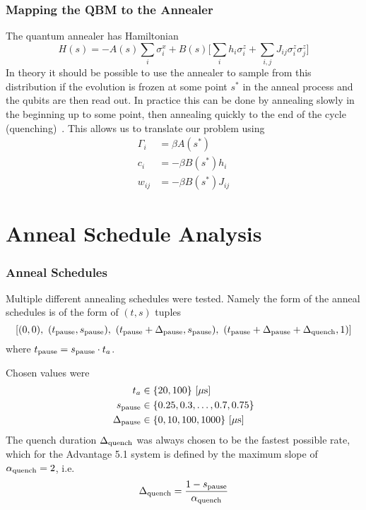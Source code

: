 \documentclass{beamer}
\begin{document}
\begin{frame}
    \frametitle{Mapping the QBM to the Annealer}
    The quantum annealer has Hamiltonian
    \[
        H(s) = -A(s) \sum_i \sigma_i^x + B(s) \bigg[ \sum_i h_i \sigma_i^z + \sum_{i,j} J_{ij} \sigma_i^z \sigma_j^z \bigg]
    \]
    In theory it should be possible to use the annealer to sample from this distribution if the evolution is frozen at some point \( s^* \) in the anneal process and the qubits are then read out. In practice this can be done by annealing slowly in the beginning up to some point, then annealing quickly to the end of the cycle (quenching)~\cite{amin_2018}.
    This allows us to translate our problem using
    \begin{align*}
        \Gamma_i
            &= \beta A(s^*) \\
        c_i
            &= -\beta B(s^*) h_i \\
        w_{ij}
            &= -\beta B(s^*) J_{ij}
    \end{align*}
\end{frame}


\section{Anneal Schedule Analysis}

\begin{frame}
    \frametitle{Anneal Schedules}
    Multiple different annealing schedules were tested.
    Namely the form of the anneal schedules is of the form of \( (t, s) \) tuples
    \[
        [(0, 0), \ (\tpause, \spause), \ (\tpause + \Deltapause, \spause), \ (\tpause + \Deltapause + \Deltaquench, 1)]
    \]
    where \( t_{\text{pause}} = s_{\text{pause}} \cdot t_a \).

    Chosen values were
    \begin{align*}
        t_a
            &\in \{20, 100\} \ [\mu\text{s}] \\
        s_{\text{pause}}
            &\in \{0.25, 0.3, \dots, 0.7, 0.75\} \\
        \Delta_{\text{pause}}
            &\in \{0, 10, 100, 1000\} \ [\mu\text{s}]
    \end{align*}
    The quench duration \( \Delta_{\text{quench}} \) was always chosen to be the fastest possible rate, which for the Advantage 5.1 system is defined by the maximum slope of \( \alpha_{\text{quench}} = 2 \), i.e.
    \[
        \Delta_{\text{quench}} = \frac{1 - s_{\text{pause}}}{\alpha_{\text{quench}}}
    \]
\end{frame}
\end{document}
